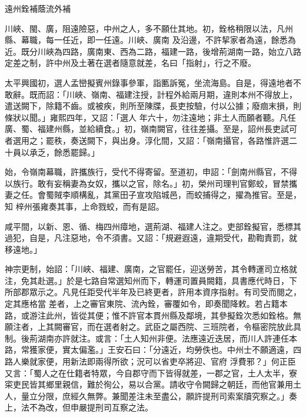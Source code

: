 
\begin{pinyinscope}

 遠州銓補蔭流外補



 川峽、閩、廣，阻遠險惡，中州之人，多不願仕其地。初，銓格稍限以法，凡州縣、幕職，每一任近，即一任遠。川峽、廣南
 及沿邊，不許挈家者為遠，餘悉為近。既分川峽為四路，廣南東、西為二路，福建一路，後增荊湖南一路，始立八路定差之制，許中州及土著在選者隨意就差，名曰「指射」，行之不廢。



 太平興國初，選人孟巒擬賓州錄事參軍，詣匭訴冤，坐流海島。自是，得遠地者不敢辭。既而詔：「川峽、嶺南、福建注授，計程外給兩月期，違則本州不得放上，遣送闕下，除籍不齒。或被疾，則所至陳牒，長吏按驗，付以公據；廢痼末損，則條狀以聞。」雍熙四年，又詔：「選人
 年六十，勿注遠地；非土人而願者聽。凡任廣、蜀、福建州縣，並給續食。」初，嶺南闕官，往往差攝。至是，詔州長吏試可者選用之；罷秩，奏送闕下，與出身。淳化間，又詔：「嶺南攝官，各路惟許選二十員以承乏，餘悉罷歸。」



 始，令嶺南幕職，許攜族行，受代不得寄留。至道初，申詔：「劍南州縣官，不得以族行。敢有妄稱妻為女奴，攜以之官，除名。」初，榮州司理判官鄭蛟，冒禁攜妻之任。會蜀賊李順構亂，其黨田子宣攻陷城邑，而蛟捕得之，擢為推官。至是，知
 梓州張雍奏其事，上命戮蛟，而有是詔。



 咸平間，以新、恩、循、梅四州瘴地，選荊湖、福建人注之。吏部銓擬官，悉標其過犯，自是，凡注惡地，令不須書。又詔：「規避遐遠，違期受代，勘鞫責罰，就移遠地。」



 神宗更制，始詔：「川峽、福建、廣南，之官罷任，迎送勞苦，其令轉運司立格就注，免其赴選。」於是七路自常選知州而下，轉運司置員闕籍，具書應代時日，下所部郡眾示之。凡見任距受代半年及已終更者，許用本資序指射。有司受而閱之，定其應格當
 差者，上之審官東院、流內銓，審覆如令，即奏聞降敕。若占籍本路，或游注此州，皆從其便；惟不許官本貫州縣及鄰境，其參擬銓次悉如銓格。無願注者，上其闕審官，而在選者射之。武臣之屬西院、三班院者，令樞密院放此具制。後荊湖南亦許就注。或言：「土人知州非便。法應遠近迭居，而川人許連任本路，常獲家便，實太偏濫。」王安石曰：「分遠近，均勞佚也。中州士不願適遠，四路人樂就家便，用新法即兩得所欲；況可以省吏卒將迎、官府
 浮費邪？」何正臣又言：「蜀人之在仕籍者特眾，今自郡守而下皆得就差，一郡之官，土人太半，寮寀吏民皆其鄉里親信，難於徇公，易以合黨。請收守令闕歸之朝廷，而他官兼用土人，量立分限，庶經久無弊。兼聞差注未至盡公，願許提刑司索案牘究察之。」奏上，法不為改，但申嚴提刑司互察之法。




\end{pinyinscope}
